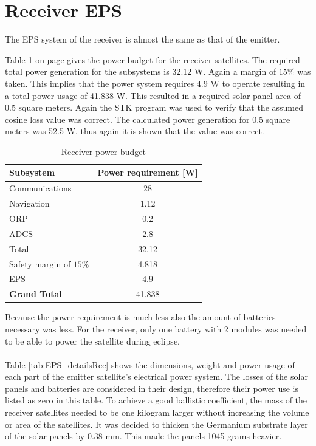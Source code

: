 \section{Receiver EPS}
\label{receiver_EPS}

The EPS system of the receiver is almost the same as that of the emitter.

Table \ref{tab:receiverPowerBudget} on page \pageref{tab:receiverPowerBudget} gives the power budget for the receiver satellites. The required total power generation for the subsystems is 32.12 W. Again a margin of $15\%$ was taken. This implies that the power system requires 4.9 W to operate resulting in a total power usage of 41.838 W. This resulted in a required solar panel area of 0.5 square meters. Again the STK program was used to verify that the assumed cosine loss value was correct. The calculated power generation for 0.5 square meters was 52.5 W, thus again it is shown that the value was correct.

\begin{table}
\centering
\begin{tabular}{lc}
\hline
Subsystem & Power requirement [W]\\
\midrule
Communications & 28\\
Navigation & 1.12\\
ORP & 0.2\\
ADCS & 2.8\\
\midrule
Total & 32.12\\
Safety margin of $15\%$ & 4.818\\
EPS & 4.9\\
\midrule
\midrule
\textbf{Grand Total} & 41.838}\\
\hline
\end{tabular}
\caption{Receiver power budget}
\label{tab:receiverPowerBudget}
\end{table}

Because the power requirement is much less also the amount of batteries necessary was less. For the receiver, only one battery with 2 modules was needed to be able to power the satellite during eclipse.
\\\\
Table \ref{tab:EPS_detailsRec} shows the dimensions, weight and power usage of each part of the emitter satellite's electrical power system. The losses of the solar panels and batteries are considered in their design, therefore their power use is listed as zero in this table. To achieve a good ballistic coefficient, the mass of the receiver satellites needed to be one kilogram larger without increasing the volume or area of the satellites. It was decided to thicken the Germanium substrate layer of the solar panels by 0.38 mm. This made the panels 1045 grams heavier.

